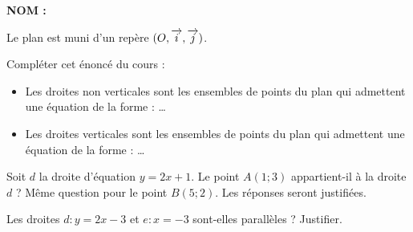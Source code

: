 \documentclass[a4paper,11pt,DIV15,BCOR0mm]{scrartcl}
\begin{document}
\newcommand{\vv}[1]{\vect{#1}}
\noindent\textbf{NOM : }

Le plan est muni d'un repère $(O,\overrightarrow{i},\overrightarrow{j})$.

\begin{exercice}
Compléter cet énoncé du cours :
\begin{itemize}
\item Les droites non verticales sont les ensembles de points du plan qui admettent
une équation de la forme : \dots

\item Les droites verticales sont les ensembles de points du plan qui admettent
une équation de la forme  : \dots
\end{itemize}


\end{exercice}
\begin{exercice}
Soit $d$ la droite d'équation $y=2x+1$. Le point $A(1;3)$ appartient-il
à la droite $d$ ? Même question pour le point $B(5;2)$. Les réponses seront justifiées.
\end{exercice}
\vfill

\begin{exercice}
Les droites $d:y=2x-3$ et $e:x=-3$ sont-elles parallèles ? Justifier.
\end{exercice}
\vfill
\end{document}
